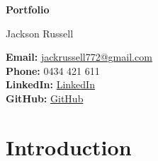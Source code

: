 \documentclass{article}
\begin{document}
\begin{titlepage}
    \centering
    \vspace*{2cm}
    {\Huge\bfseries Portfolio \par}
    \vspace{2cm}
    {\Large Jackson Russell \par}
    \vspace{1cm}

    \textbf{Email:} \href{mailto:jackrussell772@gmail.com}{jackrussell772@gmail.com} \\
    \textbf{Phone:} 0434 421 611 \\
    \textbf{LinkedIn:} \href{https://www.linkedin.com/in/jackson-russell-7aa157205/}{LinkedIn} \\ 
    \textbf{GitHub:} \href{https://github.com/jackfruittt}{GitHub} \\

    \vfill

\end{titlepage}

\tableofcontents
\newpage


\section*{Introduction}




\end{document}
